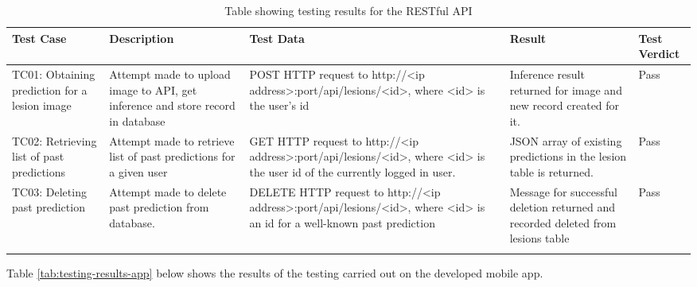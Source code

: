 \documentclass[12pt, a4paper]{article}
\begin{document}
\renewcommand{\arraystretch}{1.0}
\setlength{\tabcolsep}{6pt}
\begin{xltabular}{1\textwidth} { 
  | >{\raggedright\arraybackslash}X 
  | >{\raggedright\arraybackslash}X
  | >{\raggedright\arraybackslash}X
  | >{\raggedright\arraybackslash}X
  | >{\raggedright\arraybackslash}X
  |}
    \hline
    \textbf{Test Case} & \textbf{Description} & \textbf{Test Data} & \textbf{Result} & \textbf{Test Verdict}\\\hline
    TC01: Obtaining prediction for a lesion image & Attempt made to upload image to API, get inference and store record in database & POST HTTP request to http://<ip address>:port/api/lesions/<id>, where <id> is the user's id & Inference result returned for image and new record created for it. & Pass\\\hline
    TC02: Retrieving list of past predictions & Attempt made to retrieve list of past predictions for a given user & GET HTTP request to http://<ip address>:port/api/lesions/<id>, where <id> is the user id of the currently logged in user. & JSON array of existing predictions in the lesion table is returned. & Pass\\\hline
    TC03: Deleting past prediction & Attempt made to delete past prediction from database. & DELETE HTTP request to http://<ip address>:port/api/lesions/<id>, where <id> is an id for a well-known past prediction & Message for successful deletion returned and recorded deleted from lesions table & Pass\\\hline
    
\caption{Table showing testing results for the RESTful API}
    \label{tab:testing-results-api}
\end{xltabular}

Table \ref{tab:testing-results-app} below shows the results of the testing carried out on the developed mobile app.
\end{document}
